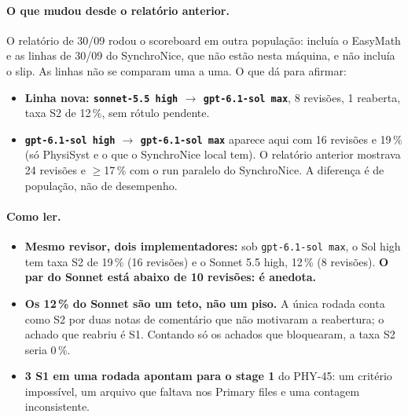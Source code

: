 \documentclass[11pt,a4paper]{article}
\begin{document}
\medskip
{}

\paragraph{O que mudou desde o relatório anterior.} O relatório de 30/09 rodou
o scoreboard em outra população: incluía o EasyMath e as linhas de 30/09 do
SynchroNice, que não estão nesta máquina, e não incluía o slip. As linhas não
se comparam uma a uma. O que dá para afirmar:
\begin{itemize}
  \item \textbf{Linha nova: \texttt{sonnet-5.5 high} $\to$ \texttt{gpt-6.1-sol
        max}}, 8 revisões, 1 reaberta, taxa S2 de 12\,\%, sem rótulo pendente.
  \item \textbf{\texttt{gpt-6.1-sol high} $\to$ \texttt{gpt-6.1-sol max}}
        aparece aqui com 16 revisões e 19\,\% (só PhysiSyst e o que o
        SynchroNice local tem). O relatório anterior mostrava 24 revisões e
        $\geq$17\,\% com o run paralelo do SynchroNice. A diferença é de
        população, não de desempenho.
\end{itemize}

\paragraph{Como ler.}
\begin{itemize}
  \item \textbf{Mesmo revisor, dois implementadores:} sob
        \texttt{gpt-6.1-sol max}, o Sol high tem taxa S2 de 19\,\% (16
        revisões) e o Sonnet 5.5 high, 12\,\% (8 revisões). \textbf{O par do
        Sonnet está abaixo de 10 revisões: é anedota.}
  \item \textbf{Os 12\,\% do Sonnet são um teto, não um piso.} A única rodada
        conta como S2 por duas notas de comentário que não motivaram a
        reabertura; o achado que reabriu é S1. Contando só os achados que
        bloquearam, a taxa S2 seria 0\,\%.
  \item \textbf{3 S1 em uma rodada apontam para o stage 1} do PHY-45: um
        critério impossível, um arquivo que faltava nos Primary files e uma
        contagem inconsistente.
\end{itemize}
\end{document}
